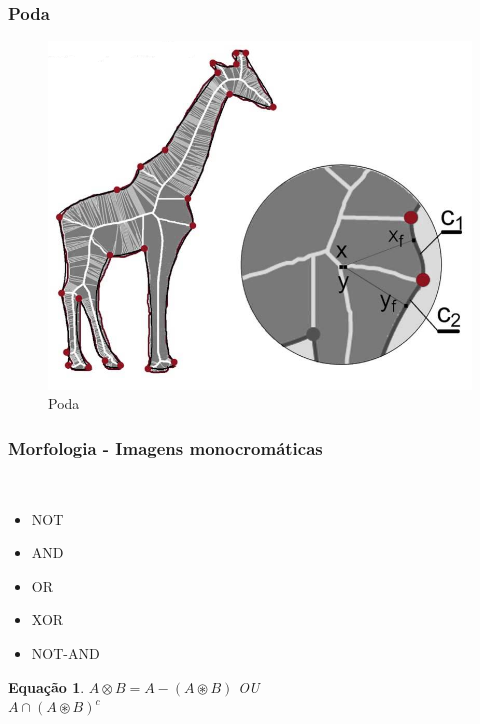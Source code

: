 \documentclass[aspectratio=169]{beamer}
\theoremstyle{Definition}
\newtheorem{eq}[theorem]{Equa\c c\~ao}
\begin{document}
\begin{frame}
	\frametitle{Poda}
	
	\begin{figure}[h]
	 	\includegraphics[width=0.6\paperwidth,height=0.6\paperheight]{imagens/prunning}
		\caption{Poda}\label{figLogical}
	\end{figure}
	
\end{frame}

\begin{frame}
	\frametitle{Morfologia - Imagens monocromáticas}
	
	\ \begin{itemize}
		\item NOT
		\item AND
		\item OR
		\item XOR
		\item NOT-AND
	\end{itemize}
	
	\begin{eq}
	$ A \otimes B = A - (A \circledast B)$  OU\\
	$ A\cap (A \circledast B)^c$

	\end{eq}
	
	
\end{frame}
\end{document}
